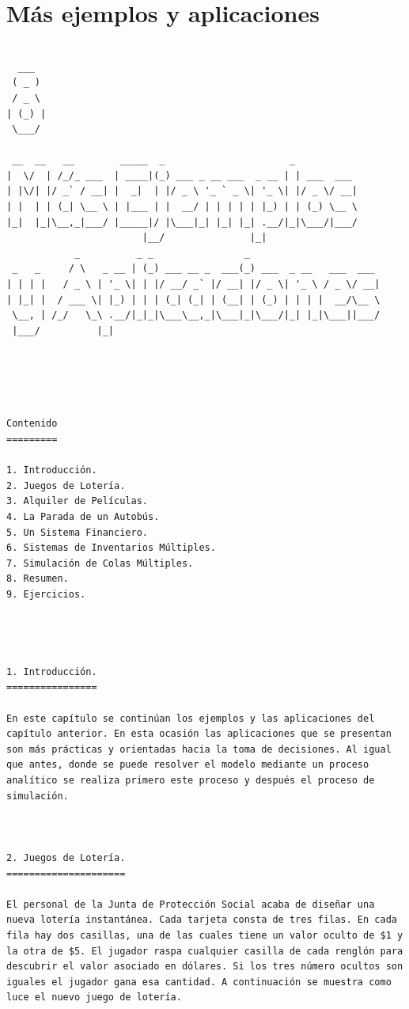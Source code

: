 \chapter{Más ejemplos y aplicaciones}
\begin{verbatim}
    
  ___
 ( _ )
 / _ \
| (_) |
 \___/

 __  __   __        _____  _                      _
|  \/  | /_/_ ___  | ____|(_) ___ _ __ ___  _ __ | | ___  ___
| |\/| |/ _` / __| |  _|  | |/ _ \ '_ ` _ \| '_ \| |/ _ \/ __|
| |  | | (_| \__ \ | |___ | |  __/ | | | | | |_) | | (_) \__ \
|_|  |_|\__,_|___/ |_____|/ |\___|_| |_| |_| .__/|_|\___/|___/
                        |__/               |_|
            _          _ _                _
 _   _     / \   _ __ | (_) ___ __ _  ___(_) ___  _ __   ___  ___
| | | |   / _ \ | '_ \| | |/ __/ _` |/ __| |/ _ \| '_ \ / _ \/ __|
| |_| |  / ___ \| |_) | | | (_| (_| | (__| | (_) | | | |  __/\__ \
 \__, | /_/   \_\ .__/|_|_|\___\__,_|\___|_|\___/|_| |_|\___||___/
 |___/          |_|





Contenido
=========

1. Introducción.
2. Juegos de Lotería.
3. Alquiler de Películas.
4. La Parada de un Autobús.
5. Un Sistema Financiero.
6. Sistemas de Inventarios Múltiples.
7. Simulación de Colas Múltiples.
8. Resumen.
9. Ejercicios.




1. Introducción.
================

En este capítulo se continúan los ejemplos y las aplicaciones del capítulo anterior. En esta ocasión las aplicaciones que se presentan son más prácticas y orientadas hacia la toma de decisiones. Al igual que antes, donde se puede resolver el modelo mediante un proceso analítico se realiza primero este proceso y después el proceso de simulación.



2. Juegos de Lotería.
=====================

El personal de la Junta de Protección Social acaba de diseñar una nueva lotería instantánea. Cada tarjeta consta de tres filas. En cada fila hay dos casillas, una de las cuales tiene un valor oculto de $1 y la otra de $5. El jugador raspa cualquier casilla de cada renglón para descubrir el valor asociado en dólares. Si los tres número ocultos son iguales el jugador gana esa cantidad. A continuación se muestra como luce el nuevo juego de lotería.



\end{verbatim}

